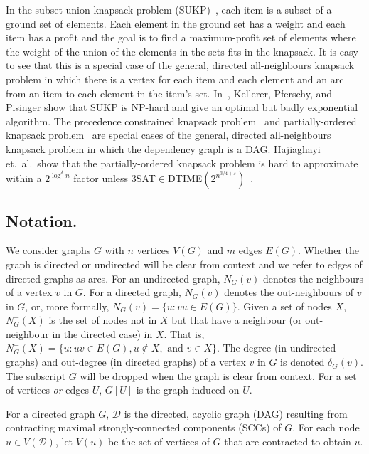 \documentclass[12pt]{article}
\begin{document}
In the subset-union knapsack problem (SUKP)~\cite{KPP}, each item is a subset
of a ground set of elements.  Each element in the ground set has a
weight and each item has a profit and the goal is to find a
maximum-profit set of elements where the weight of the union of the
elements in the sets fits in the knapsack.  It is easy to see that
this is a special case of the general, directed all-neighbours
knapsack problem in which there is a vertex for each item and each
element and an arc from an item to each element in the item's set.
In~\cite{KPP}, Kellerer, Pferschy, and Pisinger show that SUKP is
NP-hard and give an optimal but badly exponential algorithm.  The
precedence constrained knapsack problem~\cite{BFFS05} and
partially-ordered knapsack problem~\cite{Kolliopoulos:2007p1242} are
special cases of the general, directed all-neighbours knapsack problem
in which the dependency graph is a DAG.  Hajiaghayi et.~al.~show that
the partially-ordered knapsack problem is hard to approximate within a
$2^{\log^\delta n}$ factor unless
3SAT$\in$DTIME$(2^{n^{3/4+\varepsilon}})$~\cite{Hajiaghayi:2006p1244}.









\subsection{Notation.}

We consider graphs $G$ with $n$ vertices $V(G)$ and $m$ edges $E(G)$.
Whether the graph is directed or undirected will be clear from
context and we refer to edges of directed graphs as arcs.
For an undirected graph, $N_G(v)$ denotes the neighbours of a vertex $v$ in
$G$.  For a directed graph, $N_G(v)$ denotes the out-neighbours of $v$
in $G$, or, more formally, $N_G(v) = \{u : vu \in E(G)\}$.  Given a set of nodes $X$, $N^{-}_{G}(X)$ is the set of nodes not in $X$ but that have a neighbour (or out-neighbour in the directed case) in $X$.  That is, $N^{-}_{G}(X)=\{u : uv \in E(G), u \not\in X, \mbox{ and } v \in X\}$.
The degree (in undirected graphs) and out-degree (in directed graphs) of a vertex $v$
in $G$ is denoted $\delta_G(v)$.  The subscript $G$ will be dropped
when the graph is clear from context.  For a set of vertices {\em or}
edges $U$, $G[U]$ is the graph induced on $U$.

For a directed graph $G$, $\mathcal{D}$ is the directed, acyclic graph (DAG)
resulting from contracting maximal strongly-connected components
(SCCs) of $G$.  For each node $u \in V(\mathcal{D})$, let $V(u)$ be the set of
vertices of $G$ that are contracted to obtain $u$.
\end{document}
